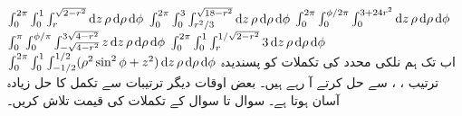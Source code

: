 $\int_{0}^{2\pi}\int_{0}^{1}\int_{r}^{\sqrt{2-r^2}} \dif z\,\rho \dif\rho\dif\phi $
$\int_{0}^{2\pi}\int_{0}^{3}\int_{r^2/3}^{\sqrt{18-r^2}} \dif z\,\rho \dif\rho\dif\phi $
$\int_{0}^{2\pi}\int_{0}^{\phi/2\pi}\int_{0}^{3+24r^2} \dif z\,\rho \dif\rho\dif\phi $
$\int_{0}^{\pi}\int_{0}^{\phi/\pi}\int_{-\sqrt{4-r^2}}^{3\sqrt{4-r^2}}z \dif z\,\rho \dif\rho\dif\phi $
$\int_{0}^{2\pi}\int_{0}^{1}\int_{r}^{1/\sqrt{2-r^2}}3 \dif z\,\rho \dif\rho\dif\phi $
$\int_{0}^{2\pi}\int_{0}^{1}\int_{-1/2}^{1/2}(\rho^2\sin^2\phi+z^2) \dif z\,\rho \dif\rho\dif\phi $
اب تک ہم  نلکی محدد کی تکملات  کو پسندیدہ  ترتیب  ، ،     سے حل کرتے آ رہے ہیں۔ بعض اوقات دیگر ترتیبات سے تکمل کا حل زیادہ آسان ہوتا ہے۔ سوال  تا سوال  کے تکملات کی قیمت تلاش کریں۔

